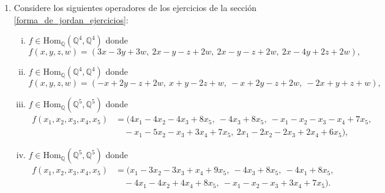   \begin{enumerate}
    \item Considere los siguientes operadores de los ejercicios de la sección \ref{forma_de_jordan_ejercicios}:
      \begin{enumerate}[(i)]
        \item $f\in\textrm{Hom}_{\mathbb{Q}}(\mathbb{Q}^4,\mathbb{Q}^4)$ donde
        $$f(x,y,z,w)=(3x-3y+3w,\ 2x-y-z+2w,\ 2x-y-z+2w,\ 2x-4y+2z+2w),$$
        \item $f\in\textrm{Hom}_{\mathbb{Q}}(\mathbb{Q}^4,\mathbb{Q}^4)$ donde
        $$f(x,y,z,w)=(-x+2y-z+2w,\ x+y-2z+w,\ -x+2y-z+2w,\ -2x+y+z+w),$$
        \item $f\in\textrm{Hom}_{\mathbb{Q}}(\mathbb{Q}^5,\mathbb{Q}^5)$ donde
        \begin{align*}
        f(x_1,x_2,x_3,x_4,x_5) & =(4x_1-4x_2-4x_3+8x_5,\ -4x_3+8x_5,\ -x_1-x_2-x_3-x_4+7x_5,\\
        &\quad -x_1-5x_2-x_3+3x_4+7x_5,\ 2x_1-2x_2-2x_3+2x_4+6x_5),
        \end{align*}
        \item $f\in\textrm{Hom}_{\mathbb{Q}}(\mathbb{Q}^5,\mathbb{Q}^5)$ donde
        \begin{align*}
        f(x_1,x_2,x_3,x_4,x_5) & =(x_1-3x_2-3x_3+x_4+9x_5,\ -4x_3+8x_5,\ -4x_1+8x_5,\\
        &\quad -4x_1-4x_2+4x_4+8x_5,\ -x_1-x_2-x_3+3x_4+7x_5).
        \end{align*}
      \end{enumerate}
      

\end{enumerate}

